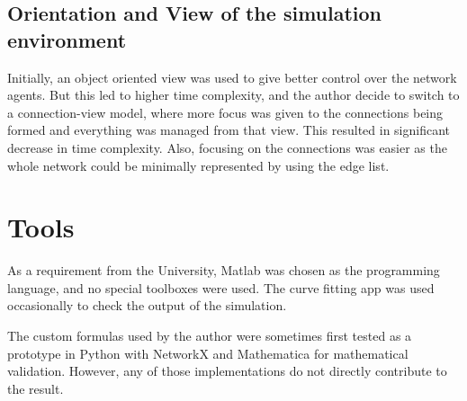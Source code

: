 \subsection{Orientation and View of the simulation environment}

Initially, an object oriented view was used to give better control over the network agents. But this led to higher time complexity, and the author decide to switch to a connection-view model, where more focus was given to the connections being formed and everything was managed from that view. This resulted in significant decrease in time complexity.
Also, focusing on the connections was easier as the whole network could be minimally represented by using the edge list.



\section{Tools}
As a requirement from the University, Matlab was chosen as the programming language, and no special toolboxes were used.
The curve fitting app was used occasionally to check the output of the simulation.

The custom formulas used by the author were sometimes first tested as a prototype in Python with NetworkX and Mathematica for mathematical validation. However, any of those implementations do not directly contribute to the result.
